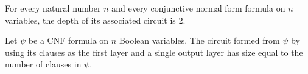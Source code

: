 \begin{theorem}
\label{FABL.DepthCircuit.depth_ofCNF}
\leanok
{}
For every natural number $n$ and every conjunctive normal form formula on $n$ variables,
the depth of its associated circuit is $2$.
\end{theorem}

\begin{theorem}
\label{FABL.DepthCircuit.size_ofCNF}
\leanok
{}
Let $\psi$ be a CNF formula on $n$ Boolean variables. The circuit formed from $\psi$ by
using its clauses as the first layer and a single output layer has size equal to the
number of clauses in $\psi$.
\end{theorem}

